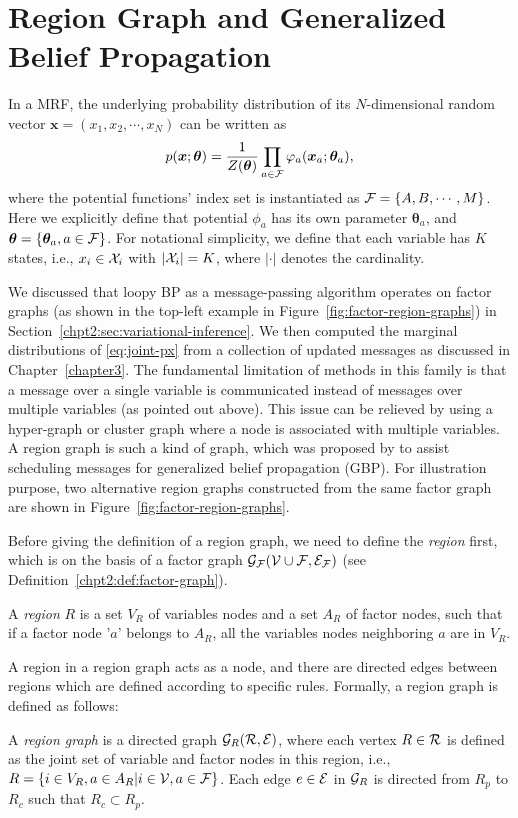 \section{Region Graph and Generalized Belief Propagation}

In a MRF, the underlying probability distribution of its $N$-dimensional random vector $\bm{x}=(x_1, x_2, \cdots, x_N)$ can be written as
\begin{equation}\label{eq:joint-px}
  p(\bm{x}; \bm{\theta}) = \frac{1}{Z(\bm{\theta})} \prod_{a \in \mathcal{F}} \varphi_{a}(\bm{x}_{a}; \bm{\theta}_a),
\end{equation}
where the potential functions' index set is instantiated as $\mathcal{F} = \left\{ A, B, \cdots, M \right\}$. Here we explicitly define that potential $\phi_a$ has its own parameter $\bm{\theta}_a$, and $\bm{\theta} = \{\bm{\theta}_a, a\in \mathcal{F}\}$. For notational simplicity, we define that each variable has $K$ states, i.e., $x_i \in \mathcal{X}_i$ with $|\mathcal{X}_i|=K$, where $|\cdot|$ denotes the cardinality.

We discussed that loopy BP as a message-passing algorithm operates on factor graphs (as shown in the top-left example in Figure~\ref{fig:factor-region-graphs}) in Section~\ref{chpt2:sec:variational-inference}. We then computed the marginal distributions of \eqref{eq:joint-px} from a collection of updated messages as discussed in Chapter~\ref{chapter3}. The fundamental limitation of methods in this family is that a message over a single variable is communicated instead of messages over multiple variables (as pointed out above). This issue can be relieved by using a hyper-graph or cluster graph where a node is associated with multiple variables. A region graph is such a kind of graph, which was proposed by \cite{yedida2005constucting, DBLP:journals/corr/abs-1207-4158} to assist scheduling messages for generalized belief propagation (GBP). For illustration purpose, two alternative region graphs constructed from the same factor graph are shown in Figure~\ref{fig:factor-region-graphs}.

Before giving the definition of a region graph, we need to define the \textit{region} first, which is on the basis of a factor graph $\mathcal{G}_{\mathcal{F}}(\mathcal{V} \cup \mathcal{F}, \mathcal{E}_{\mathcal{F}})$ (see Definition~\ref{chpt2:def:factor-graph}).
\begin{definition}
  A \textit{region} $R$ is a set $V_R$ of variables nodes and a set $A_R$ of factor nodes, such that if a factor node '$a$' belongs to $A_R$, all the variables nodes neighboring $a$ are in $V_R$.
\end{definition}
A region in a region graph acts as a node, and there are directed edges between regions which are defined according to specific rules. Formally, a region graph is defined as follows:
\begin{definition}\label{def:region-graph}
  A \textit{region graph} is  a directed graph $\mathcal{G}_R(\mathcal{R}, \mathcal{E})$, where each vertex $R \in \mathcal{R}$ is defined as the joint set of variable and factor nodes in this region, i.e., $R = \left\{ i \in V_R, a \in A_R | i \in \mathcal{V}, a \in \mathcal{F} \right\}$. Each edge $e \in \mathcal{E}$ in $\mathcal{G}_R$ is directed from $R_p$ to $R_c$ such that $R_c \subset R_p$. 
\end{definition}


